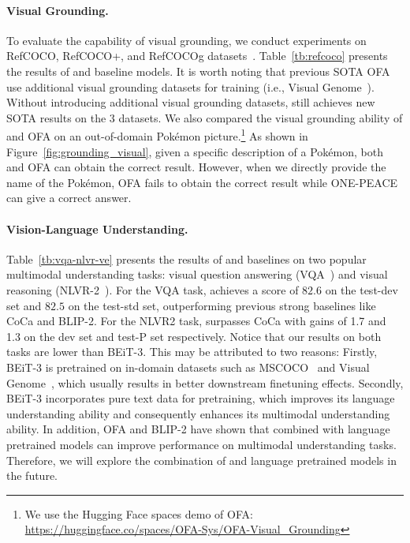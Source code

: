 \paragraph{Visual Grounding.}
To evaluate the capability of visual grounding, we conduct experiments on RefCOCO, RefCOCO+, and RefCOCOg datasets~\cite{refcoco,refcocog}. 
Table~\ref{tb:refcoco} presents the results of \onepeace and baseline models. 
It is worth noting that previous SOTA OFA use additional visual grounding datasets for training (i.e., Visual Genome~\cite{vg}). 
Without introducing additional visual grounding datasets, \onepeace still achieves new SOTA results on the $3$ datasets. 
We also compared the visual grounding ability of \onepeace and OFA on an out-of-domain Pokémon picture.\footnote{We use the Hugging Face spaces demo of OFA: \url{https://huggingface.co/spaces/OFA-Sys/OFA-Visual\_Grounding}} 
As shown in Figure~\ref{fig:grounding_visual}, given a specific description of a Pokémon, both \onepeace and OFA can obtain the correct result. 
However, when we directly provide the name of the Pokémon, OFA fails to obtain the correct result while ONE-PEACE can give a correct answer.

\paragraph{Vision-Language Understanding.}

Table~\ref{tb:vqa-nlvr-ve} presents the results of \onepeace and baselines on two popular multimodal understanding tasks: visual question answering (VQA~\cite{vqa}) and visual reasoning (NLVR-2~\cite{nlvr2}). 
For the VQA task, \onepeace achieves a score of $82.6$ on the test-dev set and $82.5$ on the test-std set, outperforming previous strong baselines like CoCa and BLIP-2.
For the NLVR2 task, \onepeace surpasses CoCa with gains of 1.7 and 1.3 on the dev set and test-P set respectively.
Notice that our results on both tasks are lower than BEiT-3. This may be attributed to two reasons: Firstly, BEiT-3 is pretrained on in-domain datasets such as MSCOCO~\cite{mscoco} and Visual Genome~\cite{vg}, which usually results in better downstream finetuning effects. 
Secondly, BEiT-3 incorporates pure text data for pretraining, which improves its language understanding ability and consequently enhances its multimodal understanding ability.
In addition, OFA and BLIP-2 have shown that combined with language pretrained models can improve performance on multimodal understanding tasks. 
Therefore, we will explore the combination of \onepeace and language pretrained models in the future.


